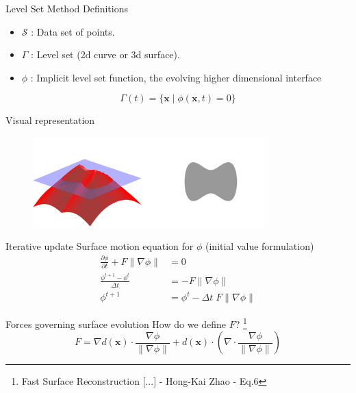 \documentclass{beamer}
\begin{document}
\begin{frame}{Level Set Method}
Definitions
\begin{itemize}
\item $\mathcal{S}$ : Data set of points.
\item $\Gamma$ : Level set (2d curve or 3d surface).
\item $\phi$ : Implicit level set function, the evolving higher dimensional interface 
\end{itemize}

\[
\Gamma(t) = \{\mathbf{x} \; | \; \phi(\mathbf{x},t) = 0\}
\]
\end{frame}
\begin{frame}{Visual representation}
\begin{figure}[H]
\centering
\includegraphics[width=0.8\textwidth]{img/Signed_distance2.png}
\end{figure}
\end{frame}
\begin{frame}{Iterative update}
Surface motion equation for $\phi$ (initial value formulation)
\begin{align}
    \frac{\partial \phi}{\partial t} + F \|\nabla \phi\| &= 0 \\
    \frac{\phi^{t+1} - \phi^{t}}{\Delta t} &=  -F \|\nabla \phi\| \\
    \phi^{t+1} &= \phi^{t} - \Delta t \; F \|\nabla \phi\| 
\end{align}
\end{frame}

\begin{frame}{Forces governing surface evolution}
How do we define $F$? \footnote{Fast Surface Reconstruction [...] - Hong-Kai Zhao - Eq.6}
\[
F = \nabla d(\mathbf{x}) \cdot \frac{\nabla \phi}{\| \nabla \phi \|}
+ d(\mathbf{x}) \cdot (\nabla \cdot \frac{\nabla \phi}{\| \nabla \phi \|} )
\]
\end{frame}
\end{document}
